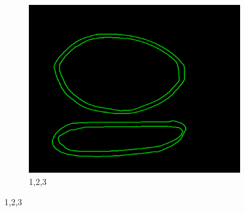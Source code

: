 \documentclass[11pt]{article}
\begin{document}
\begin{figure}
\begin{subfigure}[t]{0.32\textwidth}
		\includegraphics[scale=0.28]{pics/elimination/joinedAfterRemoval3.png}
		\caption{1,2,3}
		\label{construction3}
	\end{subfigure}
	

\end{figure}
\end{document}
